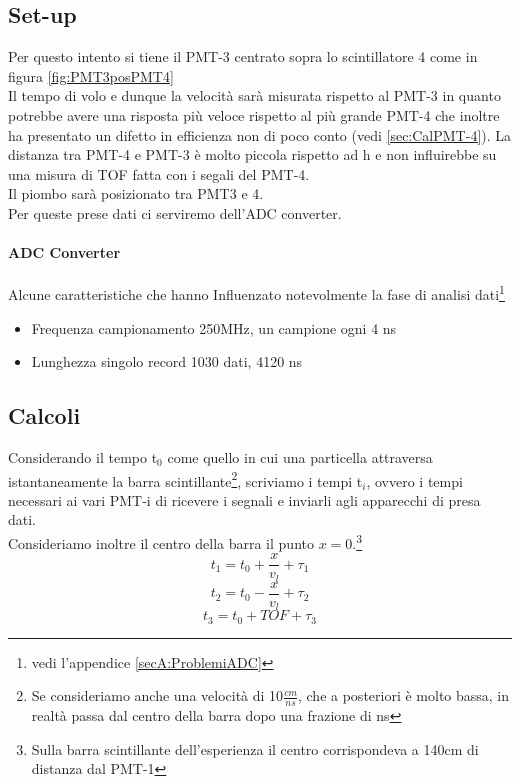 \documentclass[a4paper]{article}
\begin{document}
\subsection{Set-up}
Per questo intento si tiene il PMT-3 centrato sopra lo scintillatore 4 come in figura \ref{fig:PMT3posPMT4}\\
Il tempo di volo e dunque la velocità sarà misurata rispetto al PMT-3 in quanto potrebbe avere una risposta più veloce rispetto al più grande PMT-4 che inoltre ha presentato un difetto in efficienza non di poco conto (vedi \ref{sec:CalPMT-4}). La distanza tra PMT-4 e PMT-3 è molto piccola rispetto ad h e non influirebbe su una misura di TOF fatta con i segali del PMT-4.\\
Il piombo sarà posizionato tra PMT3 e 4.\\
Per queste prese dati ci serviremo dell'ADC converter.
\paragraph{ADC Converter}
Alcune caratteristiche che hanno Influenzato notevolmente la fase di analisi dati\footnote{vedi l'appendice \ref{secA:ProblemiADC}}
\begin{itemize}
\item Frequenza campionamento 250MHz, un campione ogni 4 ns
\item Lunghezza singolo record 1030 dati, 4120 ns
\end{itemize}

\subsection{Calcoli}
\label{sec:CalcoliVMu}
Considerando il tempo t$_0$ come quello in cui una particella attraversa istantaneamente la barra scintillante\footnote{Se consideriamo anche una velocità di 10$\frac{cm}{ns}$, che a posteriori è molto bassa, in realtà passa dal centro della barra dopo una frazione di ns}, scriviamo i tempi t$_i$, ovvero i tempi necessari ai vari PMT-i di ricevere i segnali e inviarli agli apparecchi di presa dati.\\
Consideriamo inoltre il centro della barra il punto $x = 0$.\footnote{Sulla barra scintillante dell'esperienza il centro corrispondeva a 140cm di distanza dal PMT-1}
\begin{equation}
t_1 = t_0 + \frac{x}{v_l} + \tau_1
\end{equation}
\begin{equation}
t_2 = t_0 - \frac{x}{v_l} + \tau_2
\end{equation}
\begin{equation}
t_3 = t_0 + TOF + \tau_3
\label{eq:TempiPMT}
\end{equation}
\end{document}
